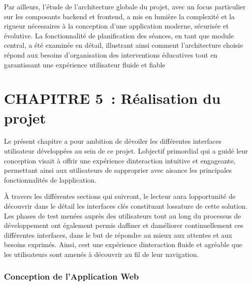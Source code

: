 \documentclass[12pt,a4paper,twoside]{report}
\begin{document}
Par ailleurs, l'étude de l'architecture globale du projet, avec un focus
particulier sur les composants backend et frontend, a mis en lumière la
complexité et la rigueur nécessaires à la conception d'une application
moderne, sécurisée et évolutive. La fonctionnalité de planification des
séances, en tant que module central, a été examinée en détail,
illustrant ainsi comment l'architecture choisie répond aux besoins
d'organisation des interventions éducatives tout en garantissant une
expérience utilisateur fluide et fiable

\hypertarget{section-7}{%
\section{}\label{section-7}}

\hypertarget{chapitre-5-ruxe9alisation-du-projet}{%
\section{CHAPITRE 5~: Réalisation du
projet}\label{chapitre-5-ruxe9alisation-du-projet}}

Le présent chapitre a pour ambition de dévoiler les différentes
interfaces utilisateur développées au sein de ce projet.
L\textquotesingle objectif primordial qui a guidé leur conception visait
à offrir une expérience d\textquotesingle interaction intuitive et
engageante, permettant ainsi aux utilisateurs de
s\textquotesingle approprier avec aisance les principales
fonctionnalités de l\textquotesingle application.

À travers les différentes sections qui suivront, le lecteur aura
l\textquotesingle opportunité de découvrir dans le détail les interfaces
clés constituant l\textquotesingle ossature de cette solution. Les
phases de test menées auprès des utilisateurs tout au long du processus
de développement ont également permis d\textquotesingle affiner et
d\textquotesingle améliorer continuellement ces différentes interfaces,
dans le but de répondre au mieux aux attentes et aux besoins exprimés.
Ainsi, c\textquotesingle est une expérience
d\textquotesingle interaction fluide et agréable que les utilisateurs
sont amenés à découvrir au fil de leur navigation.

\hypertarget{conception-de-lapplication-web}{%
\subsubsection{\texorpdfstring{\hfill\break
Conception de l'Application
Web}{ Conception de l'Application Web}}\label{conception-de-lapplication-web}}
\end{document}

